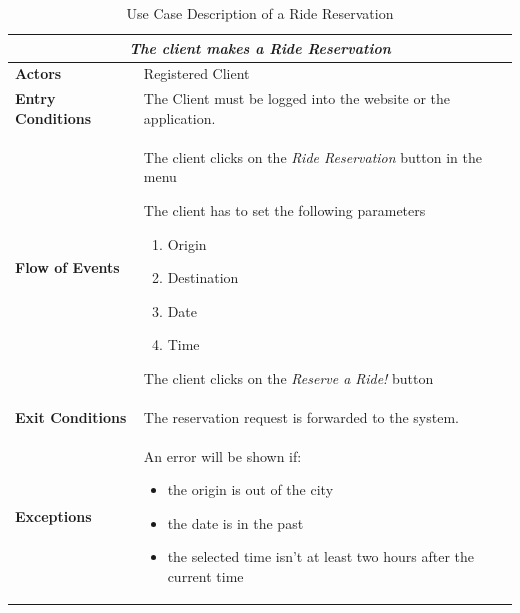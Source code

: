 \documentclass[a4paper]{article}
\begin{document}
\begin{table} [H]
\begin{center}
\begin{tabular}{ |m{}|m{}|  }
\hline
    \multicolumn{2}{|c|}{\textbf{\textit{The client makes a Ride Reservation }}} \\
\hline \hline
    \textbf{Actors}
&   Registered Client
\\ \hline
    \textbf{Entry Conditions}
&   The Client must be logged into the website or the application.
\\ \hline
    \textbf{Flow of Events}
& 
    \begin{enumerate*}
    \item The client clicks on the \emph{Ride Reservation} button in the menu
    \item The client has to set the following parameters
        \begin{enumerate}
        \item Origin
        \item Destination
        \item Date
        \item Time
        \end{enumerate}
    \item The client clicks on the \emph{Reserve a Ride!} button
    \end{enumerate*}
\\ \hline
    \textbf{Exit Conditions}
&   The reservation request is forwarded to the system.
\\ \hline
    \textbf{Exceptions}
&   An error will be shown if:
    \begin{itemize}
    \item the origin is out of the city
    \item the date is in the past
    \item the selected time isn't at least two hours after the current time
    \end{itemize}
\\ \hline
\end{tabular}
\end{center}
\caption{Use Case Description of a Ride Reservation}
\label{table:clientridereservation}
\end{table}
\end{document}
